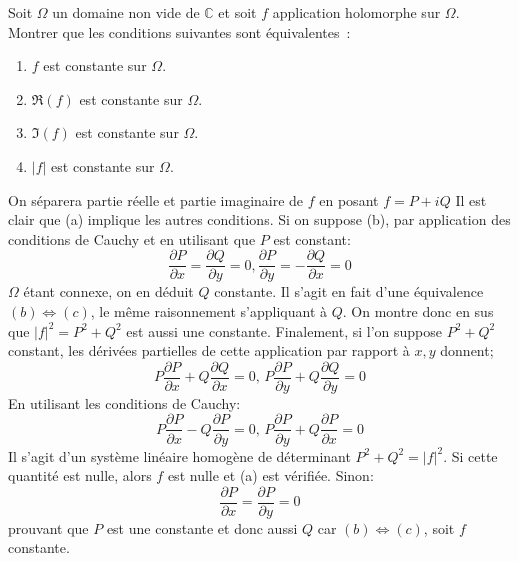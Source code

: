 \documentclass[a4paper, 12pt]{amsart}
\newcommand{\pd}[2]{\ensuremath{\frac{\partial #1}{\partial #2}}}
\begin{document}
\begin{fex}
 Soit $\Omega$ un domaine non vide de $\mathbb{C}$ et soit $f$ application
holomorphe sur $\Omega$. Montrer que les conditions suivantes sont
équivalentes~:
\renewcommand{\theenumi}{\alph{enumi}}
\begin{enumerate}
\item $f$ est constante sur $\Omega$.
\item $\Re(f)$ est constante sur $\Omega$.
\item $\Im(f)$ est constante sur $\Omega$.
\item $|f|$ est constante sur $\Omega$.
\end{enumerate}
\end{fex}
On séparera partie réelle et partie imaginaire de $f$ en posant $f=P+iQ$
Il est clair que (a) implique les autres conditions. Si on suppose (b), par
application des conditions de Cauchy et en utilisant que $P$ est constant:
\[
 \pd{P}{x} = \pd{Q}{y} = 0 , \pd{P}{y}=-\pd{Q}{x} = 0
\]
$\Omega$ étant connexe, on en déduit $Q$ constante. Il s'agit en fait d'une
équivalence $(b) \Leftrightarrow (c)$, le même raisonnement s'appliquant à $Q$.
On montre donc en sus que $|f|^2=P^2+Q^2$ est aussi une constante.
Finalement, si l'on suppose $P^2+Q^2$ constant, les dérivées partielles de
cette application par rapport à $x,y$ donnent;
\[
 P\pd{P}{x}+Q\pd{Q}{x}= 0,\,  P\pd{P}{y}+Q\pd{Q}{y}= 0
\]
En utilisant les conditions de Cauchy:
\[
 P\pd{P}{x}-Q\pd{P}{y}= 0,\,  P\pd{P}{y}+Q\pd{P}{x}= 0
\]
Il s'agit d'un système linéaire homogène de déterminant $P^2+Q^2=|f|^2$. Si
cette quantité est nulle, alors $f$ est nulle et (a) est vérifiée. Sinon:
\[
 \pd{P}{x}=\pd{P}{y}=0
\]
prouvant que $P$ est une constante et donc aussi $Q$ car $(b) \Leftrightarrow
(c)$, soit $f$ constante.
\end{document}
